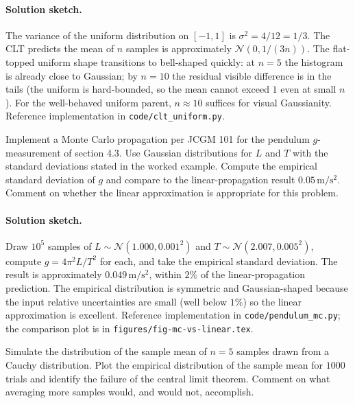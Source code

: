 \paragraph{Solution sketch.}
The variance of the uniform distribution on $[-1, 1]$ is
$\sigma^{2} = 4/12 = 1/3$. The CLT predicts the mean of $n$
samples is approximately $\mathcal{N}(0, 1/(3n))$. The
flat-topped uniform shape transitions to bell-shaped quickly:
at $n = 5$ the histogram is already close to Gaussian; by
$n = 10$ the residual visible difference is in the tails (the
uniform is hard-bounded, so the mean cannot exceed $1$ even at
small $n$). For the well-behaved uniform parent, $n \approx 10$
suffices for visual Gaussianity. Reference implementation in
\texttt{code/clt\_uniform.py}.

\begin{exercise}
Implement a Monte Carlo propagation per JCGM 101 for the pendulum
$g$-measurement of section 4.3. Use Gaussian distributions for $L$
and $T$ with the standard deviations stated in the worked example.
Compute the empirical standard deviation of $g$ and compare to the
linear-propagation result $0.05 \,\si{\meter\per\second\squared}$.
Comment on whether the linear approximation is appropriate for this
problem.
\end{exercise}

\paragraph{Solution sketch.}
Draw $10^{5}$ samples of $L \sim \mathcal{N}(1.000, 0.001^{2})$
and $T \sim \mathcal{N}(2.007, 0.005^{2})$, compute
$g = 4\pi^{2} L/T^{2}$ for each, and take the empirical standard
deviation. The result is approximately
$0.049 \,\si{\meter\per\second\squared}$, within $2\%$ of the
linear-propagation prediction. The empirical distribution is
symmetric and Gaussian-shaped because the input
relative uncertainties are small (well below $1\%$) so the
linear approximation is excellent. Reference implementation in
\texttt{code/pendulum\_mc.py}; the comparison plot is in
\texttt{figures/fig-mc-vs-linear.tex}.

\begin{exercise}
Simulate the distribution of the sample mean of $n = 5$ samples
drawn from a Cauchy distribution. Plot the empirical distribution
of the sample mean for $1000$ trials and identify the failure of
the central limit theorem. Comment on what averaging more samples
would, and would not, accomplish.
\end{exercise}

